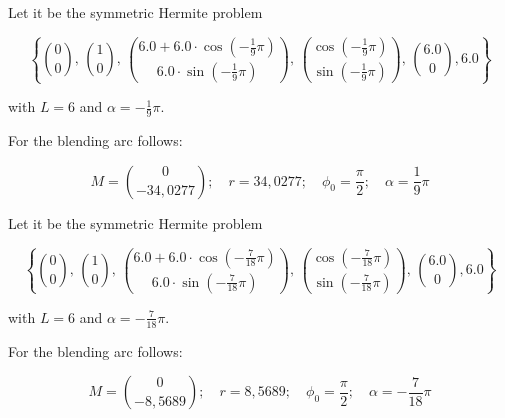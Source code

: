 \BEISPIEL
{
  Let it be the symmetric Hermite problem 
  
  $$\left\{\binom{0}{0},\, \binom{1}{0},\,
  \binom{6.0+6.0\cdot \cos\left(-\frac{1}{9}\pi\right)}{6.0\cdot \sin\left(-\frac{1}{9}\pi\right)},\, \binom{\cos\left(-\frac{1}{9}\pi\right)}{\sin\left(-\frac{1}{9}\pi\right)},\, \binom{6.0}{0},6.0\right\}$$
  
  with $L=6$ and $\alpha=-\frac{1}{9}\pi$.
  
  For the blending arc follows:
  
  $$M=\binom{0}{-34,0277}; \quad r=34,0277;\quad \phi_0 = \frac{\pi}{2}; \quad \alpha=\frac{1}{9}\pi$$
  
  
  \begin{center}
  \end{center}
}



\BEISPIEL
{
  Let it be the symmetric Hermite problem 
  
  $$\left\{\binom{0}{0},\, \binom{1}{0},\,
  \binom{6.0+6.0\cdot \cos\left(-\frac{7}{18}\pi\right)}{6.0\cdot \sin\left(-\frac{7}{18}\pi\right)},\, \binom{\cos\left(-\frac{7}{18}\pi\right)}{\sin\left(-\frac{7}{18}\pi\right)},\, \binom{6.0}{0},6.0\right\}$$
  
  with $L=6$ and $\alpha=-\frac{7}{18}\pi$.
  
  For the blending arc follows:
  
  $$M=\binom{0}{-8,5689}; \quad r=8,5689;\quad \phi_0 = \frac{\pi}{2}; \quad \alpha=-\frac{7}{18}\pi$$
  
  
  \begin{center}
  \end{center}
}


